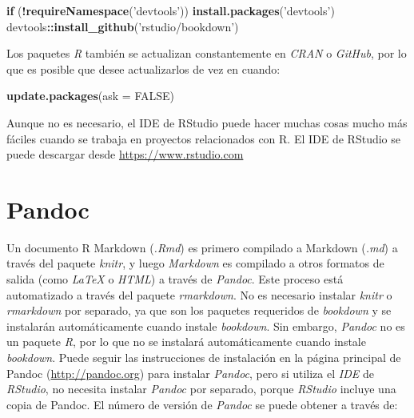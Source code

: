 \documentclass[12pt,]{krantz}
\makeatletter
\newenvironment{Shaded}{\begin{snugshade}}{\end{snugshade}}
\newcommand{\ControlFlowTok}[1]{\textcolor[rgb]{0.13,0.29,0.53}{\textbf{#1}}}
\newcommand{\DataTypeTok}[1]{\textcolor[rgb]{0.13,0.29,0.53}{#1}}
\newcommand{\KeywordTok}[1]{\textcolor[rgb]{0.13,0.29,0.53}{\textbf{#1}}}
\newcommand{\NormalTok}[1]{#1}
\newcommand{\OperatorTok}[1]{\textcolor[rgb]{0.81,0.36,0.00}{\textbf{#1}}}
\newcommand{\OtherTok}[1]{\textcolor[rgb]{0.56,0.35,0.01}{#1}}
\newcommand{\StringTok}[1]{\textcolor[rgb]{0.31,0.60,0.02}{#1}}
\newenvironment{kframe}{%
\medskip{}
\setlength{\fboxsep}{.8em}
 \def\at@end@of@kframe{}%
 \ifinner\ifhmode%
  \def\at@end@of@kframe{\end{minipage}}%
  \begin{minipage}{\columnwidth}%
 \fi\fi%
 \def\FrameCommand##1{\hskip\@totalleftmargin \hskip-\fboxsep
 \colorbox{shadecolor}{##1}\hskip-\fboxsep
     \hskip-\linewidth \hskip-\@totalleftmargin \hskip\columnwidth}%
 \MakeFramed {\advance\hsize-\width
   \@totalleftmargin\z@ \linewidth\hsize
   \@setminipage}}%
 {\par\unskip\endMakeFramed%
 \at@end@of@kframe}
\renewenvironment{Shaded}{\begin{kframe}}{\end{kframe}}
\makeatother
\begin{document}
\begin{Shaded}
\begin{Highlighting}[]
\ControlFlowTok{if}\NormalTok{ (}\OperatorTok{!}\KeywordTok{requireNamespace}\NormalTok{(}\StringTok{'devtools'}\NormalTok{)) }\KeywordTok{install.packages}\NormalTok{(}\StringTok{'devtools'}\NormalTok{)}
\NormalTok{devtools}\OperatorTok{::}\KeywordTok{install_github}\NormalTok{(}\StringTok{'rstudio/bookdown'}\NormalTok{)}
\end{Highlighting}
\end{Shaded}

Los paquetes \emph{R} también se actualizan constantemente en \emph{CRAN} o \emph{GitHub}, por lo que es posible que desee actualizarlos de vez en cuando:

\begin{Shaded}
\begin{Highlighting}[]
\KeywordTok{update.packages}\NormalTok{(}\DataTypeTok{ask =} \OtherTok{FALSE}\NormalTok{)}
\end{Highlighting}
\end{Shaded}

Aunque no es necesario, el IDE de RStudio puede hacer muchas cosas mucho más fáciles cuando se trabaja en proyectos relacionados con R. El IDE de RStudio se puede descargar desde \url{https://www.rstudio.com}

\hypertarget{pandoc}{%
\section{Pandoc}\label{pandoc}}

Un documento R Markdown (\emph{.Rmd}) es primero compilado a Markdown (\emph{.md}) a través del paquete \emph{knitr}, y luego \emph{Markdown} es compilado a otros formatos de salida (como \emph{LaTeX} o \emph{HTML}) a través de \emph{Pandoc}. Este proceso está automatizado a través del paquete \emph{rmarkdown}. No es necesario instalar \emph{knitr} o \emph{rmarkdown} por separado, ya que son los paquetes requeridos de \emph{bookdown} y se instalarán automáticamente cuando instale \emph{bookdown}. Sin embargo, \emph{Pandoc} no es un paquete \emph{R}, por lo que no se instalará automáticamente cuando instale \emph{bookdown}. Puede seguir las instrucciones de instalación en la página principal de Pandoc (\url{http://pandoc.org}) para instalar \emph{Pandoc}, pero si utiliza el \emph{IDE} de \emph{RStudio}, no necesita instalar \emph{Pandoc} por separado, porque \emph{RStudio} incluye una copia de Pandoc. El número de versión de \emph{Pandoc} se puede obtener a través de:
\end{document}
